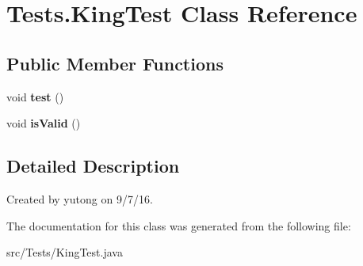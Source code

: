 \hypertarget{classTests_1_1KingTest}{\section{Tests.\-King\-Test Class Reference}
\label{classTests_1_1KingTest}
}
\subsection*{Public Member Functions}
\begin{DoxyCompactItemize}
\item 
\hypertarget{classTests_1_1KingTest_ae382fc23b711db05996165878caf85fb}{void {\bfseries test} ()}\label{classTests_1_1KingTest_ae382fc23b711db05996165878caf85fb}

\item 
\hypertarget{classTests_1_1KingTest_a4864b7967fdc6e7e0c74f72cc21efbff}{void {\bfseries is\-Valid} ()}\label{classTests_1_1KingTest_a4864b7967fdc6e7e0c74f72cc21efbff}

\end{DoxyCompactItemize}


\subsection{Detailed Description}
Created by yutong on 9/7/16. 

The documentation for this class was generated from the following file\-:\begin{DoxyCompactItemize}
\item 
src/\-Tests/King\-Test.\-java\end{DoxyCompactItemize}
